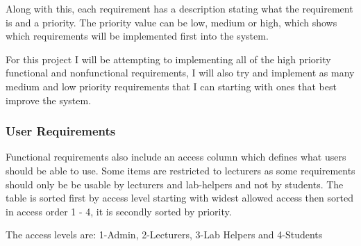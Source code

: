 \documentclass[12pt]{article}  %
\begin{document}
Along with this, each requirement has a description stating what the requirement is and a priority. The priority value can be low, medium or high, which shows which requirements will be implemented first into the system.

For this project I will be attempting to implementing all of the high priority functional and nonfunctional requirements, I will also try and implement as many medium and low priority requirements that I can starting with ones that best improve the system.

\def\arraystretch{1.5}
\subsubsection{User Requirements}
Functional requirements also include an access column which defines what users should be able to use. Some items are restricted to lecturers as some requirements should only be be usable by lecturers and lab-helpers and not by students. The table is sorted first by access level starting with widest allowed access then sorted in access order 1 - 4, it is secondly sorted by priority.

The access levels are: 1-Admin, 2-Lecturers, 3-Lab Helpers and 4-Students
\end{document}
